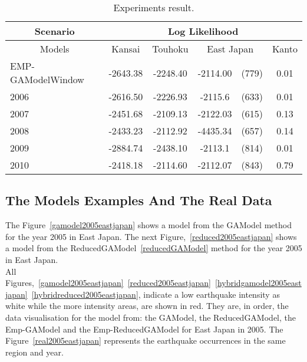 \begin{table*}[!ht]
	\begin{center}
		\begin{tabular}{|l|l|c|cc|c|}
			\hline
			\multicolumn{1}{|c|}{Scenario} & \multicolumn{5}{|c|}{Log Likelihood} \\
			\hline
			\multicolumn{1}{|c|}{Models} & \multicolumn{1}{|c|}{Kansai} & \multicolumn{1}{|c|}{Touhoku} & \multicolumn{2}{c}{East Japan} & \multicolumn{1}{|c|}{Kanto} \\    
			\hline
			EMP-GAModelWindow &-2643.38 &-2248.40 &\raggedright  -2114.00 &\raggedleft (779) & 0.01\\%
			2006 &-2616.50 &-2226.93 &\raggedright  -2115.6 &\raggedleft (633) & 0.01\\%
			2007 &-2451.68 &-2109.13 &\raggedright  -2122.03 &\raggedleft (615) &  0.13\\%
			2008 &-2433.23 &-2112.92 &\raggedright  -4435.34 &\raggedleft (657) & 0.14\\%
			2009 &-2884.74 &-2438.10 &\raggedright  -2113.1 &\raggedleft (814) & 0.01\\%
			2010 &-2418.18 &-2114.60 &\raggedright -2112.07 &\raggedleft (843) & 0.79\\%
			\hline
		\end{tabular}
	\end{center}
	\caption{Experiments result.}
	\label{Paired}
\end{table*}


\subsection{The Models Examples And The Real Data}

The Figure~\ref{gamodel2005eastjapan} shows a model from the GAModel method for the year 2005 in East Japan. The next Figure,~\ref{reduced2005eastjapan} shows a model from the ReducedGAModel~\ref{reducedGAModel} method for the year 2005 in East Japan.\\

All Figures,~\ref{gamodel2005eastjapan}~\ref{reduced2005eastjapan}~\ref{hybridgamodel2005eastjapan}~\ref{hybridreduced2005eastjapan},  indicate a low earthquake intensity as white while the more intensity areas, are shown in red. They are, in order, the data visualisation for the model from: the GAModel, the ReducedGAModel, the Emp-GAModel and the Emp-ReducedGAModel for East Japan in 2005. The Figure~\ref{real2005eastjapan} represents the earthquake occurrences in the same region and year.\\


